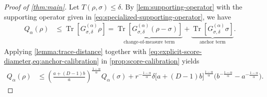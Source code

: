 \documentclass[11pt,reqno]{amsart}
\theoremstyle{definition}
\DeclareMathOperator{\Tr}{Tr}
\begin{document}
\begin{proof}[Proof of \cref{thm:main}]
Let $T(\rho,\sigma)\leq\delta$.  By
\cref{lem:supporting-operator} with the supporting operator given in
\cref{eq:specialized-supporting-operator}, we have
\begin{align}\label{eq:supporting-transport-split}
 Q_\alpha(\rho)
 &\leq \Tr\!\left[G_{\sigma,\delta}^{(\alpha)}\rho\right]
 =
 \underbrace{\Tr\!\left[G_{\sigma,\delta}^{(\alpha)}(\rho-\sigma)\right]}_{\text{change-of-measure term}}
+ \underbrace{\Tr\!\left[G_{\sigma,\delta}^{(\alpha)}\sigma\right]}_{\text{anchor term}}.
\end{align}
Applying \cref{lemma:trace-distance} together with
\cref{eq:explicit-score-diameter,eq:anchor-calibration} in \cref{prop:score-calibration} yields
\begin{align}
 Q_\alpha(\rho)
 &\leq
 \left(\frac{a+(D-1)b}{a}\right)^{\frac{1-\alpha}{\alpha}}Q_\alpha(\sigma)
 +r^{-\frac{1-\alpha}{\alpha}}\delta
 \bigl[a+(D-1)b\bigr]^{\frac{1-\alpha}{\alpha}}
 \bigl(b^{-\frac{1-\alpha}{\alpha}}-a^{-\frac{1-\alpha}{\alpha}}\bigr).
 \label{eq:score-proof-before-scalar}
\end{align}



\end{proof}
\end{document}
